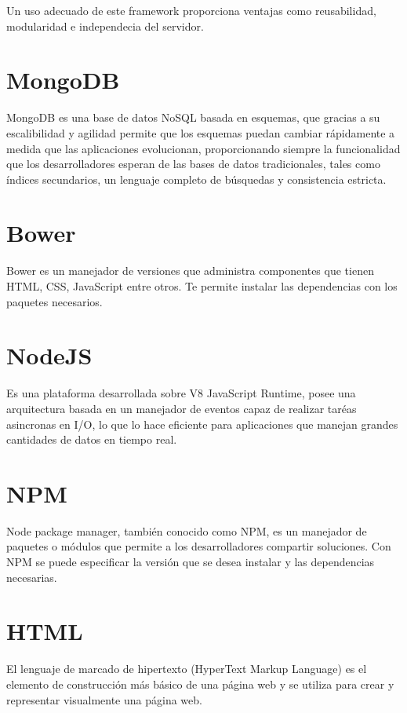Un uso adecuado de este framework proporciona ventajas como reusabilidad, modularidad e independecia del servidor.\cite{ANG}

\section{MongoDB} \label{sect:MongoDB}
MongoDB es una base de datos NoSQL basada en esquemas, que gracias a su escalibilidad y agilidad permite que los esquemas puedan cambiar rápidamente a medida que las aplicaciones evolucionan, proporcionando siempre la funcionalidad que los desarrolladores esperan de las bases de datos tradicionales, tales como índices secundarios, un lenguaje completo de búsquedas y consistencia estricta.\cite{MDB}

\section{Bower} \label{sect:Bower}
Bower es un manejador de versiones que administra componentes que tienen HTML, CSS, JavaScript entre otros. Te permite instalar las dependencias con los paquetes necesarios.\cite{BW}

\section{NodeJS} \label{sect:NodeJS}
Es una plataforma desarrollada sobre V8 JavaScript Runtime, posee una arquitectura basada en un manejador de eventos capaz de realizar taréas asincronas en I/O, lo que lo hace eficiente para aplicaciones que manejan grandes cantidades de datos en tiempo real.\cite{NODE}

\section{NPM} \label{sect:NPM}
Node package manager, también conocido como NPM, es un manejador de paquetes o módulos que permite a los desarrolladores compartir soluciones. Con NPM se puede especificar la versión que se desea instalar y las dependencias necesarias.\cite{NPM}

\section{HTML} \label{sect:HTML}
El lenguaje de marcado de hipertexto (HyperText Markup Language) es el elemento de construcción más básico de una página web y se utiliza para crear y representar visualmente una página web.\cite{HTML}

